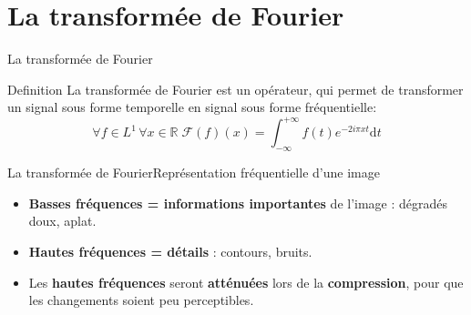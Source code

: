 \section{La transformée de Fourier}

\begin{frame}{La transformée de Fourier}{}
    \begin{block}{Definition}
        La transformée de Fourier est un opérateur, qui permet de transformer un signal sous forme temporelle en signal sous forme fréquentielle: 
         \[ \forall f \in L^1 \, \forall x \in \mathbb{R} \; \mathcal{F}(f)(x) = \int_{-\infty}^{+\infty} f(t)e^{-2i\pi xt}\mathrm{d}t\]
    \end{block}
\end{frame}

\begin{frame}{La transformée de Fourier}{Représentation fréquentielle d'une image}
	\begin{itemize}
		\item <1-> \textbf{Basses fréquences = informations importantes} de l'image : dégradés doux,  aplat.
		\item <2-> \textbf{Hautes fréquences = détails} : contours, bruits.
		\item <3-> Les \textbf{hautes fréquences} seront \textbf{atténuées} lors de la \textbf{compression}, pour que les changements soient peu perceptibles. 
	\end{itemize}
\end{frame}


